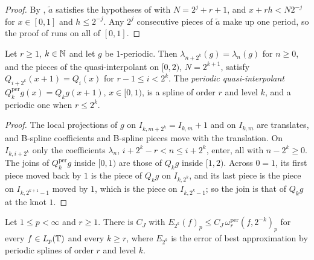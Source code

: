 \begin{proof}
\leanok
By , $\tilde a$ satisfies the hypotheses of 
with $N = 2^j + r + 1$, and $x + rh < N 2^{-j}$ for $x \in [0, 1]$ and $h \leq 2^{-j}$. Any $2^j$
consecutive pieces of $\tilde a$ make up one period, so the proof of 
runs on all of $[0, 1]$.
\end{proof}

\begin{lemma}
\label{lem:per-qi}
\leanok
{}
Let $r \geq 1$, $k \in \mathbb{N}$ and let $g$ be $1$-periodic. Then $\lambda_{n + 2^k}(g) = \lambda_n(g)$
for $n \geq 0$, and the pieces of the quasi-interpolant on $[0, 2)$, $N = 2^{k+1}$, satisfy
$Q_{i + 2^k}(x + 1) = Q_i(x)$ for $r - 1 \leq i < 2^k$. The \emph{periodic quasi-interpolant}
$Q_k^{\mathrm{per}} g(x) = Q_k g(x + 1)$, $x \in [0, 1)$, is a spline of order $r$ and level $k$,
and a periodic one when $r \leq 2^k$.
\end{lemma}

\begin{proof}
\leanok
The local projections of $g$ on $I_{k, m + 2^k} = I_{k,m} + 1$ and on $I_{k,m}$ are translates,
and B-spline coefficients and B-spline pieces move with the translation. On $I_{k, i + 2^k}$ only
the coefficients $\lambda_n$, $i + 2^k - r < n \leq i + 2^k$, enter, all with $n - 2^k \geq 0$. The
joins of $Q_k^{\mathrm{per}} g$ inside $[0, 1)$ are those of $Q_k g$ inside $[1, 2)$. Across
$0 = 1$, its first piece moved back by $1$ is the piece of $Q_k g$ on $I_{k, 2^k}$, and its last
piece is the piece on $I_{k, 2^{k+1} - 1}$ moved by $1$, which is the piece on $I_{k, 2^k - 1}$;
so the join is that of $Q_k g$ at the knot $1$.
\end{proof}

\begin{theorem}
\label{thm:per-spline-jackson}
\leanok
{}
Let $1 \leq p < \infty$ and $r \geq 1$. There is $C_J$ with
$E_{2^k}(f)_p \leq C_J \, \omega_r^{\mathrm{per}}(f, 2^{-k})_p$ for every $f \in L_p(\mathbb{T})$ and
every $k \geq r$, where $E_{2^k}$ is the error of best approximation by periodic splines of order
$r$ and level $k$.
\end{theorem}

